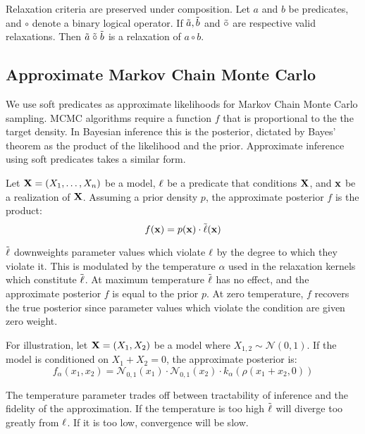 \begin{proposition}Relaxation criteria are preserved under composition.
Let $a$ and $b$ be predicates, and $\circ$ denote a binary logical operator.  If $\tilde{a}, \tilde{b}$ and $\mathrel{\tilde{\circ}}$ are respective valid relaxations.  Then $\tilde{a} \mathrel{\tilde{\circ}} \tilde{b}$ is a relaxation of $a \circ b$.
\end{proposition}



\subsection{Approximate Markov Chain Monte Carlo}
We use soft predicates as approximate likelihoods for Markov Chain Monte Carlo sampling.
MCMC algorithms require a function $f$ that is proportional to the the target density.
In Bayesian inference this is the posterior, dictated by Bayes' theorem as the product of the likelihood and the prior.
Approximate inference using soft predicates takes a similar form.

\begin{definition}
Let $\mathbf{X} = (X_1, \dots, X_n)$ be a model, $\operatorname{\ell}$ be a predicate that conditions $\mathbf{X}$, and  $\mathbf{x}$ be a realization of $\mathbf{X}$.
Assuming a prior density $p$, the approximate posterior $f$ is the product:
\begin{equation}\label{fpm}
f(\mathbf{x}) = p(\mathbf{x}) \cdot \tilde{\operatorname{\ell}}(\mathbf{x})
  \end{equation}
\end{definition}
$\mathrel{\tilde{\operatorname{\ell}}}$ downweights parameter values which violate $\operatorname{\ell}$ by the degree to which they violate it. 
This is modulated by the temperature $\alpha$ used in the  relaxation kernels which constitute $\mathrel{\tilde{\operatorname{\ell}}}$.
At maximum temperature $\mathrel{\tilde{\operatorname{\ell}}}$ has no effect, and the approximate posterior $f$ is equal to the prior $p$.
At zero temperature, $f$ recovers the true posterior since parameter values which violate the condition are given zero weight.

For illustration, let $\mathbf{X} = (X_1, X_2)$ be a model where $X_{1,2} \sim \mathcal{N}(0, 1)$.
If the model is conditioned on $X_1 + X_2 = 0$, the approximate posterior is:
\begin{equation}\label{approxposterior}
f_\alpha(x_1, x_2) = \mathcal{N}_{0,1}(x_1) \cdot \mathcal{N}_{0,1}(x_2) \cdot k_\alpha(\rho(x_1 + x_2, 0)) 
\end{equation}

The temperature parameter trades off between tractability of inference and the fidelity of the approximation.
If the temperature is too high $\mathrel{\tilde{\operatorname{\ell}}}$ will diverge too greatly from $\operatorname{\ell}$. If it is too low, convergence will be slow.

